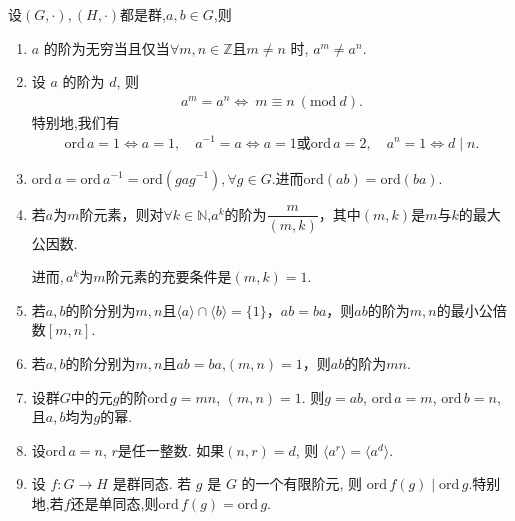 \documentclass[../../main.tex]{subfiles}%
\begin{document}
\begin{theorem}[群元素的阶的基本性质]\label{theorem:群元素的阶的基本性质}
设$(G,\cdot),(H,\cdot)$都是群,$a,b\in G$,则
\begin{enumerate}[(1)]
\item\label{theorem:群元素的阶的基本性质-1} \( a \) 的阶为无穷当且仅当$\forall m,n\in \mathbb{Z}$且\( m \neq n \) 时, \( a^m \neq a^n \).

\item\label{theorem:群元素的阶的基本性质-2}  设 \( a \) 的阶为 \( d \), 则
\begin{align}
a^m = a^n \iff \ m \equiv n \ (\text{mod}\ d). \label{eq:1.2.4-1341294782947}
\end{align}
特别地,我们有
\begin{gather*}
\text{ord}\,a=1\iff a=1,\quad a^{-1}=a\Longleftrightarrow a=1\text{或ord}\,a=2,
\quad
a^n=1 \iff d\mid n.
\end{gather*}

\item\label{theorem:群元素的阶的基本性质-3}  $\text{ord}\,a = \text{ord}\,a^{-1} = \text{ord}(gag^{-1}),\forall g\in G.$进而$\text{ord}(ab)=\text{ord}(ba).$

\item\label{theorem:群元素的阶的基本性质-4} 若$a$为$m$阶元素，则对$\forall k\in \mathbb{N}$,$a^k$的阶为$\dfrac{m}{(m,k)}$，其中$(m,k)$是$m$与$k$的最大公因数.

进而,$\,a^k$为$m$阶元素的充要条件是$(m,k)=1$.

\item\label{theorem:群元素的阶的基本性质-5} 若$a,b$的阶分别为$m,n$且$\langle a\rangle\cap\langle b\rangle=\{1\}$，$ab=ba$，则$ab$的阶为$m,n$的最小公倍数$[m,n]$.

\item\label{theorem:群元素的阶的基本性质-6} 若$a,b$的阶分别为$m,n$且$ab=ba$,$(m,n)=1$，则$ab$的阶为$mn$.

\item\label{theorem:群元素的阶的基本性质-8} 设群$G$中的元$g$的阶$\text{ord}\,g=mn$, $(m,n)=1$. 则$g=ab$, $\text{ord}\,a=m$, $\text{ord}\,b=n$, 且$a,b$均为$g$的幂.

\item\label{theorem:群元素的阶的基本性质-7} 设$\mathrm{ord}\,a = n$, $r$是任一整数. 如果$(n,r) = d$, 则
$\langle a^r \rangle = \langle a^d \rangle.$

\item\label{theorem:群元素的阶的基本性质-9} 设 $f: G \longrightarrow H$ 是群同态. 若 $g$ 是 $G$ 的一个有限阶元, 则 $\text{ord}\,f(g)\mid \text{ord}\,g$.特别地,若$f$还是单同态,则$\text{ord}\,f(g)=\text{ord}\,g$.
\end{enumerate}
\end{theorem}
\end{document}
